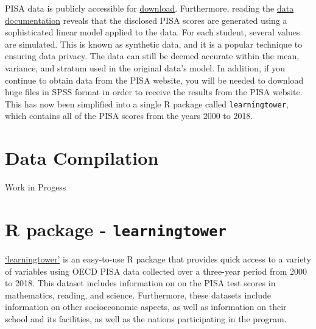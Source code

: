 PISA data is publicly accessible for
\href{https://www.oecd.org/pisa/data/}{download}. Furthermore, reading
the
\href{https://www.oecd.org/pisa/data/pisa2018technicalreport/Ch.09-Scaling-PISA-Data.pdf}{data
documentation} reveals that the disclosed PISA scores are generated
using a sophisticated linear model applied to the data. For each
student, several values are simulated. This is known as synthetic data,
and it is a popular technique to ensuring data privacy. The data can
still be deemed accurate within the mean, variance, and stratum used in
the original data's model. In addition, if you continue to obtain data
from the PISA website, you will be needed to download huge files in SPSS
format in order to receive the results from the PISA website. This has
now been simplified into a single R package called
\texttt{learningtower}, which contains all of the PISA scores from the
years 2000 to 2018.

\hypertarget{data-compilation}{%
\section{Data Compilation}\label{data-compilation}}

Work in Progess

\hypertarget{r-package---learningtower}{%
\section{\texorpdfstring{R package -
\texttt{learningtower}}{R package - learningtower}}\label{r-package---learningtower}}

\href{https://cran.r-project.org/web/packages/learningtower/index.html}{`learningtower'}
is an easy-to-use R package that provides quick access to a variety of
variables using OECD PISA data collected over a three-year period from
2000 to 2018. This dataset includes information on on the PISA test
scores in mathematics, reading, and science. Furthermore, these datasets
include information on other socioeconomic aspects, as well as
information on their school and its facilities, as well as the nations
participating in the program.

